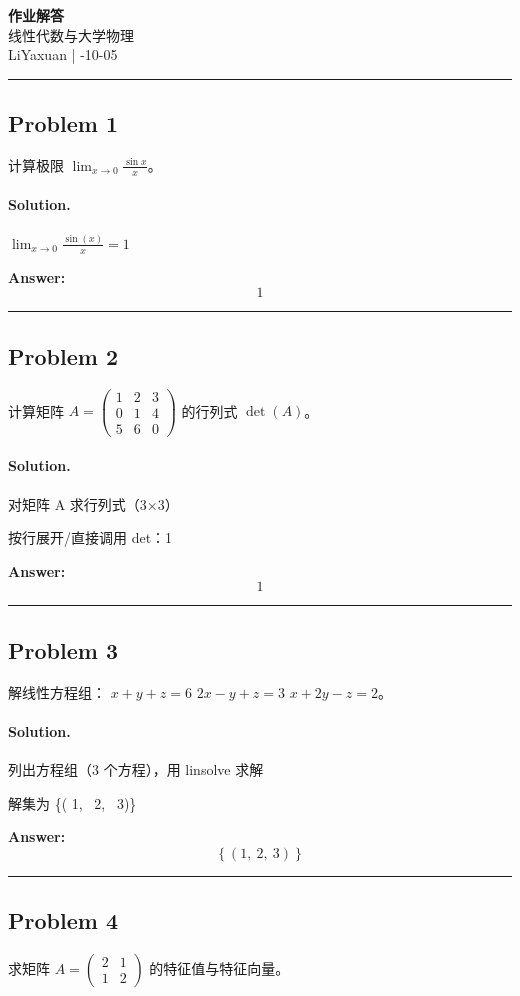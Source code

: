 \documentclass[12pt, a4paper]{article}
\newcommand{\problem}[1]{\subsection*{Problem #1}}
\newcommand{\solution}{\paragraph{Solution.}}
\begin{document}
\begin{center}
    {\LARGE\bfseries 作业解答} \\[0.5em]
    {\large 线性代数与大学物理} \\[0.3em]
    LiYaxuan \quad | -10-05
\end{center}

\hrule
\vspace{1em}
\problem{1}

计算极限 $\lim_{x \to 0} \frac{\sin x}{x}$。

\solution

$\lim_{x \to 0} \frac{\sin{\left(x \right)}}{x} = 1$

\textbf{Answer:}
\[\boxed{1}\]

\vspace{1em}
\hrule
\vspace{1em}

\problem{2}

计算矩阵 $A = \begin{pmatrix} 1 & 2 & 3 \\ 0 & 1 & 4 \\ 5 & 6 & 0 \end{pmatrix}$ 的行列式 $\det(A)$。

\solution

对矩阵 A 求行列式（3×3）

按行展开/直接调用 det：1

\textbf{Answer:}
\[\boxed{1}\]

\vspace{1em}
\hrule
\vspace{1em}

\problem{3}

解线性方程组：
$x + y + z = 6$
$2x - y + z = 3$
$x + 2y - z = 2$。

\solution

列出方程组（3 个方程），用 linsolve 求解

解集为 \left\{\left( 1, \  2, \  3\right)\right\}

\textbf{Answer:}
\[\boxed{\left\{\left( 1, \  2, \  3\right)\right\}}\]

\vspace{1em}
\hrule
\vspace{1em}

\problem{4}

求矩阵 $A = \begin{pmatrix} 2 & 1 \\ 1 & 2 \end{pmatrix}$ 的特征值与特征向量。
\end{document}
